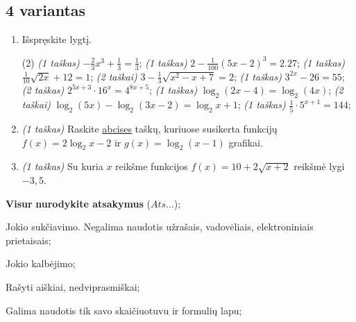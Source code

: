 \documentclass[a4paper]{article}
\begin{document}
\vspace*{12mm}


\subsection*{4 variantas}

\begin{enumerate}
      \item Išspręskite lygtį.
            \begin{tasks}[item-format={\normalfont}, after-item-skip=2mm](2)
                  \task \textit{(1 taškas)} $-\frac{2}{3}x^3+\frac{1}{3}=\frac{1}{3}$;
                  \task \textit{(1 taškas)} $2-\frac{1}{100}\left(5x-2\right)^3=2.27$;
                  \task \textit{(1 taškas)} $\frac{1}{10}\sqrt{2x}+12=1$;
                  \task \textit{(2 taškai)} $3-\frac{1}{3}\sqrt{x^2-x+7}=2$;
                  \task \textit{(1 taškas)} $3^{2x}-26=55$;
                  \task \textit{(2 taškas)} $2^{5x+3}\cdot16^{x}=4^{8x+5}$;
                  \task \textit{(1 taškas)} $\log_2(2x-4)=\log_2(4x)$;
                  \task \textit{(2 taškai)} $\log_2(5x)-\log_2(3x-2)=\log_2x+1$;
                  \task \textit{(1 taškas)} $\frac{1}{5}\cdot 5^{x+1}=144$;
            \end{tasks}

      \item \textit{(1 taškas)} Raskite \underline{abcises} taškų, kuriuose susikerta funkcijų $f(x)=2\log _2x-2$ ir $g(x)=\log _2\left(x-1\right)$ grafikai.
      \item \textit{(1 taškas)} Su kuria $x$ reikšme funkcijos $f(x)=10+2\sqrt{x+2}$ reikšmė lygi $-3,5$.
\end{enumerate}


\begin{small}
      \begin{enumerate*}[label={(\arabic*)}]
            \item \textbf{Visur} \textbf{nurodykite atsakymus} ($Ats\ldots$);
            \item Jokio sukčiavimo. Negalima naudotis užrašais, vadovėliais,
            elektroniniais prietaisais;
            \item Jokio kalbėjimo;
            \item Rašyti aiškiai, nedviprasmiškai;
            \item Galima naudotis tik savo skaičiuotuvu ir formulių lapu;
      \end{enumerate*}
\end{small}
            
\end{document}
